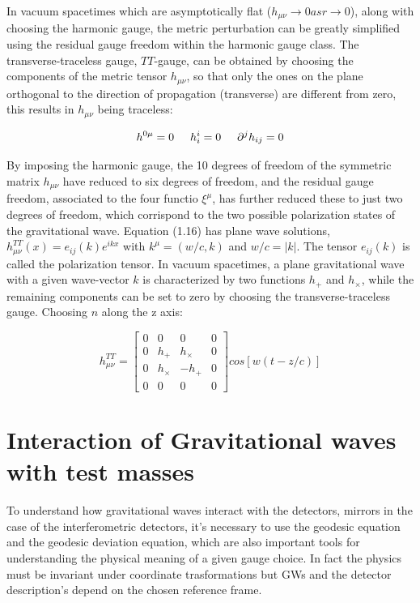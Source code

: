 \documentclass[binding=0.6cm, LaM]{sapthesis}
\begin{document}
In vacuum spacetimes which are asymptotically flat ($h_{\mu\nu} \rightarrow 0 as r \rightarrow 0$), along with choosing the harmonic gauge, the metric perturbation can be greatly simplified using 
the residual gauge freedom within the harmonic gauge class. The transverse-traceless gauge,  $TT$-gauge, can be obtained by choosing the components of the metric tensor $h_{\mu\nu}$, 
so that only the ones on the plane orthogonal to the direction of propagation (transverse) are different from zero, this results in $h_{\mu\nu}$ being traceless:

\begin{equation}
h^{0\mu} = 0 \hspace*{0.5cm}  h^{i}_i = 0  \hspace*{0.5cm}   {\partial}^jh_{ij} = 0
\end{equation}

By imposing the harmonic gauge, the 10 degrees of freedom of the symmetric matrix $h_{\mu\nu}$ have reduced to six degrees of freedom, and the residual gauge freedom, 
associated to the four functio $\xi^{\mu}$, has further reduced these to just two degrees of freedom, which corrispond to the two possible polarization states of the gravitational wave. 
Equation (1.16) has plane wave solutions, $h_{\mu\nu}^{TT}(x)=e_{ij}(k)e^{ikx}$ with $k^{\mu}=(w/c,k)$ and $w/c=|k|$. The tensor $e_{ij}(k)$ is called the polarization tensor. 
In vacuum spacetimes, a plane gravitational wave with a given wave-vector $k$ is characterized by two functions $h_+$ and $h_{\times}$, while the remaining components can be set to zero by 
choosing the transverse-traceless gauge. Choosing $n$ along the z axis:

\begin{equation} 
h_{\mu\nu}^{TT} = 
\begin{bmatrix}
0 & 0 & 0 & 0 \\
0 & h_{+} & h_{\times} & 0 \\
0 & h_{\times} & -h_{+} & 0 \\
0 & 0 & 0 & 0 
\end{bmatrix}cos[w(t-z/c)]
\end{equation}




\chapter{Interaction of Gravitational waves with test masses}

To understand how gravitational waves interact with the detectors, mirrors in the case of the interferometric detectors, it's necessary to use the geodesic equation and 
the geodesic deviation equation, which are also important tools for understanding the physical meaning of a given gauge choice. 
In fact the physics must be invariant under coordinate trasformations but GWs and the detector description's depend on the chosen reference frame. 
\end{document}
